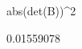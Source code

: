 \begin{Schunk}
\begin{Sinput}
 abs(det(B))^2
\end{Sinput}
\begin{Soutput}
[1] 0.01559078
\end{Soutput}
\end{Schunk}
